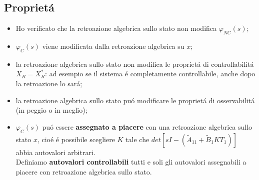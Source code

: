 \documentclass[../main.tex]{subfiles}
\begin{document}
	\subsection{Propriet\'a}
		\begin{itemize}
			\item
				Ho verificato che la retroazione algebrica sullo stato non modifica $ \varphi_{NC}(s) $;
			\item
				$ \varphi_C(s) $ viene modificata dalla retroazione algebrica su $ x $;
			\item 
				la retroazione algebrica sullo stato non modifica le propriet\'a di controllabilit\'a $ X_R = X_R^{*} $: ad esempio se il sistema \'e completamente controllabile, anche dopo la retroazione lo sar\'a;
			\item 
				la retroazione algebrica sullo stato pu\'o modificare le propriet\'a di osservabilit\'a (in peggio o in meglio);
			\item
				$ \varphi_C(s) $ pu\'o essere \textbf{assegnato a piacere} con una retroazione algebrica sullo stato $ x $, cio\'e \'e possibile scegliere $ K $ tale che $ det\left[ sI - (\tilde A_{11} + \tilde B_1 K T_1) \right] $ abbia autovalori arbitrari.\\
				Definiamo \textbf{autovalori controllabili} tutti e soli gli autovalori assegnabili a piacere con retroazione algebrica sullo stato.
		\end{itemize}
	
\end{document}
